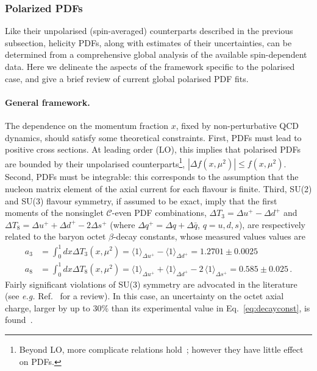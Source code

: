 \subsubsection{Polarized PDFs}
\label{sec:polPDFs}

Like their unpolarised (spin-averaged) counterparts described in the previous 
subsection, helicity PDFs, along with estimates of their uncertainties, can be 
determined from a comprehensive global analysis of the available spin-dependent 
data. 
%
Here we delineate the aspects of the framework specific to the polarised
case, and give a brief review of current global polarised PDF fits.

\paragraph{General framework.}
%
%
The dependence on the momentum fraction $x$, fixed by non-perturbative QCD 
dynamics, should satisfy some theoretical constraints.
%
First, PDFs must lead to positive cross sections.
At leading order (LO), this implies that polarised 
PDFs are bounded by their unpolarised counterparts\footnote{Beyond LO, more 
complicate relations hold~\cite{Altarelli:1998gn}; however they have little
effect on PDFs.}, $|\Delta f(x,\mu^2)|\leq f(x,\mu^2)$.
%
Second, PDFs must be integrable: this corresponds to the assumption 
that the nucleon matrix element of the axial current for each flavour is finite.
%
Third, SU(2) and SU(3) flavour symmetry, if assumed to be exact, imply that 
the first moments of the nonsinglet $\mathcal{C}$-even PDF combinations,
$\Delta T_3=\Delta u^+ -\Delta d^+$ and 
$\Delta T_8 = \Delta u^+ +\Delta d^+ -2\Delta s^+$ 
(where $\Delta q^+=\Delta q+\Delta\bar{q}$, $q=u,d,s$), are respectively
related to the baryon octet $\beta$-decay constants, whose 
measured values values are~\cite{Olive:2016xmw}
\begin{align}
 a_3
 & =
 \int_0^1 dx \Delta T_3 (x,\mu^2)
 = \langle 1\rangle_{\Delta u^+} - \langle 1\rangle_{\Delta d^+}  = 1.2701 \pm 0.0025\\
 a_8
 & =
 \int_0^1 dx \Delta T_8 (x,\mu^2)
 = \langle 1 \rangle_{\Delta u^+} + \langle 1 \rangle_{\Delta d^+} -2\,\langle 1 \rangle_{\Delta s^+} 
 =0.585  \pm 0.025
 \,\mbox{.}
\label{eq:decayconst}
\end{align}
%
Fairly significant violations of SU(3) symmetry are advocated
in the literature (see {\it e.g.} Ref.~\cite{Cabibbo:2003cu} for a review). 
%
In this case, an uncertainty on the octet axial charge, larger by up to $30\%$ 
than its experimental value in Eq.~\eqref{eq:decayconst}, 
is found~\cite{FloresMendieta:1998ii}. 


